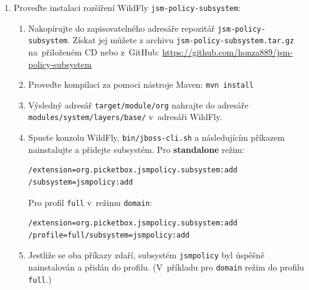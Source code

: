 \begin{enumerate}
  \item Proveďte instalaci rozšíření WildFly {\tt jsm-policy-subsystem}:
  \begin{enumerate}
    \item Nakopírujte do zapisovatelného adresáře repozitář {\tt jsm-policy-subsystem}. Získat jej můžete z archivu {\tt jsm-policy-subsystem.tar.gz} na~přiloženém CD nebo z~GitHub:
      \newline\url{https://github.com/honza889/jsm-policy-subsystem}
    \item Proveďte kompilaci za pomoci nástroje Maven: {\tt mvn install}
    \item Výsledný adresář {\tt target/module/org} nahrajte do adresáře {\tt modules/system/la\linebreak yers/base/} v~adresáři WildFly.
    \item Spusťe konzolu WildFly, {\tt bin/jboss-cli.sh} a následujícím příkazem nainstalujte a přidejte subsystém. Pro {\bf standalone} režim:
      \begin{lstlisting}
/extension=org.picketbox.jsmpolicy.subsystem:add
/subsystem=jsmpolicy:add
      \end{lstlisting}
      Pro profil {\tt full} v~režimu {\tt domain}:
      \begin{lstlisting}
/extension=org.picketbox.jsmpolicy.subsystem:add
/profile=full/subsystem=jsmpolicy:add
      \end{lstlisting}
    \item Jestliže se oba příkazy zdaří, subsystém {\tt jsmpolicy} byl úspěšně nainstalován a přidán do profilu. (V~příkladu pro {\tt domain} režim do profilu {\tt full}.)
  \end{enumerate}
  

\end{enumerate}
